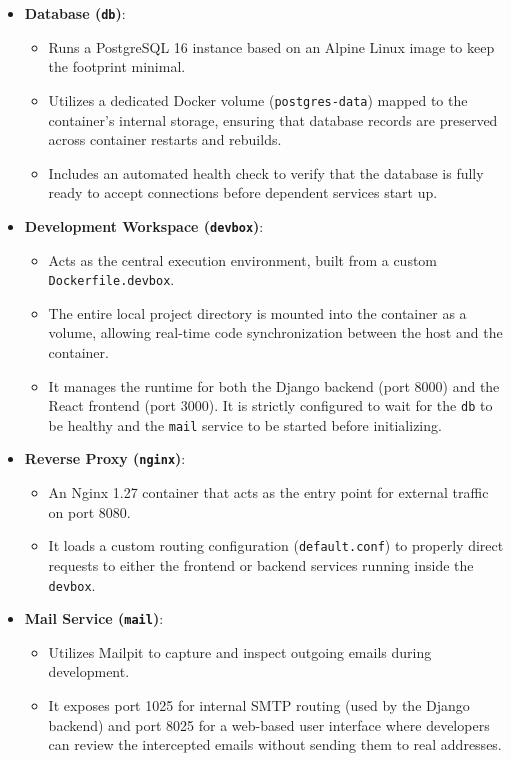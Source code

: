 \begin{itemize}
    \item \textbf{Database (\texttt{db})}:
    \begin{itemize}
        \item Runs a PostgreSQL 16 instance based on an Alpine Linux image to keep the footprint minimal.
        \item Utilizes a dedicated Docker volume (\texttt{postgres-data}) mapped to the container's internal storage, ensuring that database records are preserved across container restarts and rebuilds.
        \item Includes an automated health check to verify that the database is fully ready to accept connections before dependent services start up.
    \end{itemize}
    
    \item \textbf{Development Workspace (\texttt{devbox})}:
    \begin{itemize}
        \item Acts as the central execution environment, built from a custom \texttt{Dockerfile.devbox}.
        \item The entire local project directory is mounted into the container as a volume, allowing real-time code synchronization between the host and the container.
        \item It manages the runtime for both the Django backend (port 8000) and the React frontend (port 3000). It is strictly configured to wait for the \texttt{db} to be healthy and the \texttt{mail} service to be started before initializing.
    \end{itemize}
    
    \item \textbf{Reverse Proxy (\texttt{nginx})}:
    \begin{itemize}
        \item An Nginx 1.27 container that acts as the entry point for external traffic on port 8080.
        \item It loads a custom routing configuration (\texttt{default.conf}) to properly direct requests to either the frontend or backend services running inside the \texttt{devbox}.
    \end{itemize}
    
    \item \textbf{Mail Service (\texttt{mail})}:
    \begin{itemize}
        \item Utilizes Mailpit to capture and inspect outgoing emails during development.
        \item It exposes port 1025 for internal SMTP routing (used by the Django backend) and port 8025 for a web-based user interface where developers can review the intercepted emails without sending them to real addresses.
    \end{itemize}
\end{itemize}

